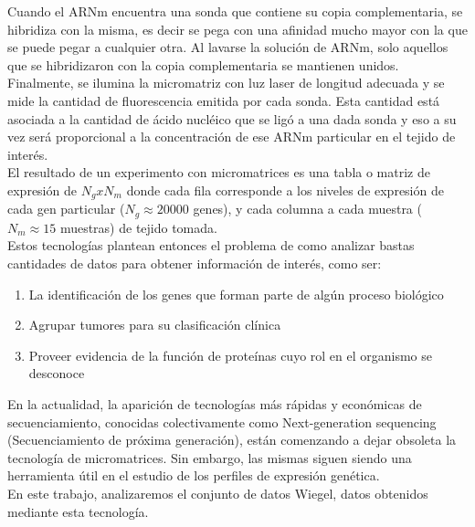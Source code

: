 Cuando el ARNm encuentra una sonda que contiene su copia complementaria, se hibridiza con la misma, es decir se pega con una afinidad mucho mayor con la que se puede pegar a cualquier otra. Al lavarse la solución de ARNm, solo aquellos que se hibridizaron con la copia complementaria se mantienen unidos. Finalmente, se ilumina la micromatriz con luz laser de longitud adecuada y se mide la cantidad de fluorescencia emitida por cada sonda. Esta cantidad está asociada a la cantidad de ácido nucléico que se ligó a una dada sonda y eso a su vez será proporcional a la concentración de ese ARNm particular en el tejido de interés.\\
El resultado de un experimento con micromatrices es una tabla o matriz de expresión de $N_g x N_m$ donde cada fila corresponde a los niveles de expresión de cada gen particular ($N_g \approx 20000$ genes), y cada columna a cada muestra ($N_m \approx 15$ muestras) de tejido tomada.\\
Estos tecnologías plantean entonces el problema de como analizar bastas cantidades de datos para obtener información de interés, como ser:
\begin{enumerate}
	\item La identificación de los genes que forman parte de algún proceso biológico
	\item Agrupar tumores para su clasificación clínica
	\item Proveer evidencia de la función de proteínas cuyo rol en el organismo se desconoce
\end{enumerate}
En la actualidad, la aparición de tecnologías más rápidas y económicas de secuenciamiento, conocidas colectivamente como Next-generation sequencing (Secuenciamiento de próxima generación), están comenzando a dejar obsoleta la tecnología de micromatrices. Sin embargo, las mismas siguen siendo una herramienta útil en el estudio de los perfiles de expresión genética.\\
En este trabajo, analizaremos el conjunto de datos Wiegel, datos obtenidos mediante esta tecnología.\cite{Babu2004,Schulze2001,Domany2003}
